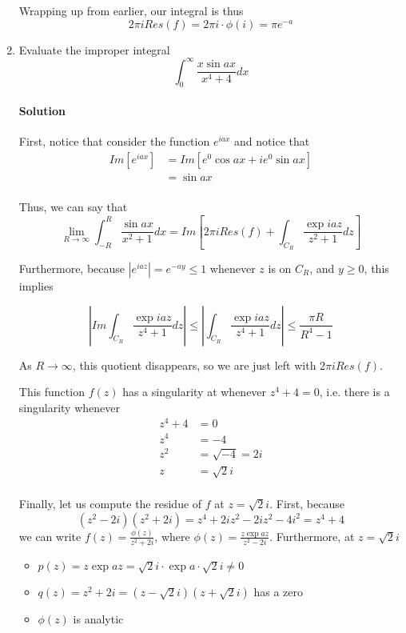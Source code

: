 \documentclass[11pt]{article}
\begin{document}
\begin{enumerate}
	\bigskip
	
	Wrapping up from earlier, our integral is thus
	\[ 2\pi i Res(f) = 2\pi i \cdot \phi(i) = \pi e^{-a} \]
	
	\item Evaluate the improper integral
	\[ \int^{\infty}_0 \frac{x \sin{ax}}{x^4 + 4} dx \]
	
	\paragraph{Solution} First, notice that consider the function 
	$e^{iax}$ and notice that
	\[\begin{aligned}
	Im[e^{iax}]
	&= Im[e^0 \cos{ax} + ie^0 \sin{ax}] \\
	&= \sin{ax} \\
	\end{aligned}\]
	
	Thus, we can say that
	\[
	\lim_{R \rightarrow \infty} \int^R_{-R} \frac{\sin{ax}}{x^2 + 1} dx =
	Im[2\pi i Res(f) + \int_{C_R} \frac{\exp{iaz}}{z^2 + 1} dz]
	\]
	
	Furthermore, because $|e^{iaz}| = e^{-ay} \leq 1$	
	whenever $z$ is on $C_R$, and $y \geq 0$, this implies
	
	\[|Im \int_{C_R} \frac{\exp{iaz}}{z^4 + 1} dz| \leq
	|\int_{C_R} \frac{\exp{iaz}}{z^4 + 1} dz| \leq 
	\frac{\pi R}{R^4 - 1}\]
	
	As $R \rightarrow \infty$, this quotient disappears, so we are just left with $2\pi i Res(f)$. 
	
	\bigskip
	
	This function $f(z)$ has a singularity at whenever $z^4 + 4 = 0$, i.e. there is a singularity whenever
	\[\begin{aligned}
		z^4 + 4 &= 0 \\
		z^4 &= -4 \\
		z^2 &= \sqrt{-4} = 2i \\
		z &= \sqrt{2} i \\
	\end{aligned}\]
	
	Finally, let us compute the residue of $f$ at $z = \sqrt{2}i$. First, because
	\[(z^2 - 2i)(z^2 + 2i) = z^4 + 2i z^2 - 2i z^2 - 4i^2 = z^4 + 4\]
	we can write
    $f(z) = \frac{\phi(z)}{z^2 + 2i}$, where $\phi(z) = \frac{z \exp{az}}{z^2 - 2i}$. 	
	Furthermore, at $z = \sqrt{2}i$
	\begin{itemize}
		\item $p(z) = z\exp{az} = \sqrt{2}i \cdot \exp{a \cdot \sqrt{2}i} \neq 0$
		\item $q(z) = z^2 + 2i = (z - \sqrt{2}i)(z + \sqrt{2}i)$ has a zero
		\item $\phi(z)$ is analytic
	\end{itemize}
	

\end{enumerate}
\end{document}
